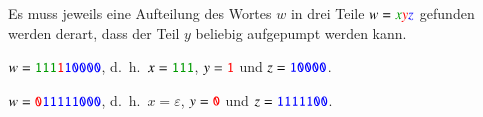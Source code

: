 \begin{loesung}
Es muss jeweils eine Aufteilung des Wortes $w$ in drei Teile
$w={\color{darkgreen}x}{\color{red}y}{\color{blue}z}$ gefunden
werden derart, dass der Teil $y$ beliebig aufgepumpt werden kann.
\begin{teilaufgaben}
\item
$w=\texttt{{\color{darkgreen}111}{\color{red}1}{\color{blue}10000}}$,
d.~h.~$x=\texttt{\color{darkgreen}111}$, $y=\texttt{\color{red}1}$
und $z=\texttt{\color{blue}10000}$.
\item
$w=\texttt{{\color{red}0}{\color{blue}11111000}}$,
d.~h.~$x=\varepsilon$, $y=\texttt{\color{red}0}$ und
$z=\texttt{\color{blue}1111100}$.
\qedhere
\end{teilaufgaben}
\end{loesung}
